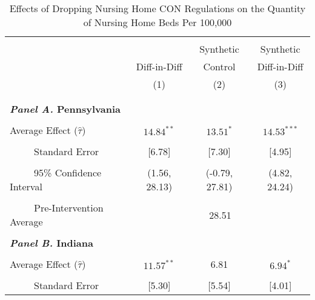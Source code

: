 \documentclass[../Main.tex]{subfiles}
\begin{document}
\newpage
\null
\vfill
\begin{table}[htbp]\centering \footnotesize
\def\sym#1{\ifmmode^{#1}\else\(^{#1}\)\fi}
\captionsetup{width=.75\textwidth}
\caption{\centering Effects of Dropping Nursing Home CON Regulations on the Quantity of Nursing Home Beds Per 100,000}
\label{tab:ave_results_q_nhb_nobord_nocov}
\setlength{\tabcolsep}{10pt}
\begin{tabular}{l*{3}{c}}
\hline\hline
\\[-2ex]
&\multicolumn{1}{c}{}&\multicolumn{1}{c}{Synthetic}&\multicolumn{1}{c}{Synthetic}\\
&\multicolumn{1}{c}{Diff-in-Diff}&\multicolumn{1}{c}{Control}&\multicolumn{1}{c}{Diff-in-Diff}\\
&\multicolumn{1}{c}{(1)}&\multicolumn{1}{c}{(2)}&\multicolumn{1}{c}{(3)}\\
\\[-2ex]
\hline
\\[-.1ex]
\multicolumn{4}{l}{\textbf{\textit{Panel A.} Pennsylvania}}\\
\\[-1.5ex]
\multicolumn{1}{l}{Average Effect ($\hat{\tau}$)}&   \multicolumn{1}{c}{$14.84^{**}$}&   \multicolumn{1}{c}{$13.51^{*}$}&  \multicolumn{1}{c}{$14.53^{***}$}\\
\\[-2ex]
\multicolumn{1}{l}{\ \ \ \ \ Standard Error}  &\multicolumn{1}{c}{[6.78]}&\multicolumn{1}{c}{[7.30]}&\multicolumn{1}{c}{[4.95]}\\
\\[-2ex]
\multicolumn{1}{l}{\ \ \ \ \ 95\% Confidence Interval}&   \multicolumn{1}{c}{(1.56, 28.13)}&   \multicolumn{1}{c}{(-0.79, 27.81)}&   \multicolumn{1}{c}{(4.82, 24.24)}\\
\\[-2ex]
\multicolumn{1}{l}{\ \ \ \ \ Pre-Intervention Average}&   \multicolumn{3}{c}{28.51}\\
\\[-.1ex]
\multicolumn{4}{l}{\textbf{\textit{Panel B.} Indiana}}\\
\\[-1.5ex]
\multicolumn{1}{l}{Average Effect ($\hat{\tau}$)}&   \multicolumn{1}{c}{$11.57^{**}$}&   \multicolumn{1}{c}{6.81} &  \multicolumn{1}{c}{$6.94^{*}$}\\
\\[-2ex]
\multicolumn{1}{l}{\ \ \ \ \ Standard Error}  &\multicolumn{1}{c}{[5.30]}&\multicolumn{1}{c}{[5.54]}&\multicolumn{1}{c}{[4.01]}\\

\end{tabular}
\end{table}
\end{document}
